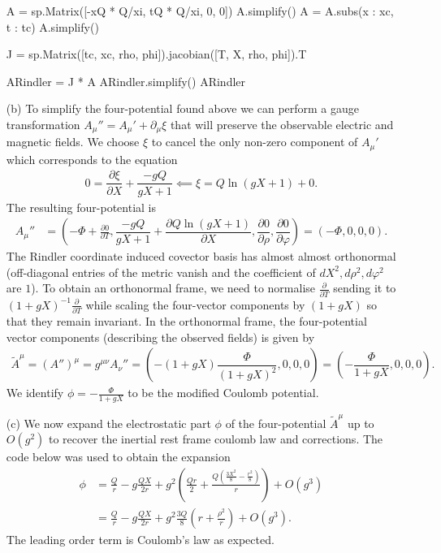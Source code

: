 \documentclass[10pt, a4paper]{article}
\begin{document}
\begin{enumerate}
\begin{python}
A = sp.Matrix([-xQ * Q/xi, tQ * Q/xi, 0, 0])
A.simplify()
A = A.subs({x : xc, t : tc})
A.simplify()

J = sp.Matrix([tc, xc, rho, phi]).jacobian([T, X, rho, phi]).T

ARindler = J * A
ARindler.simplify()
ARindler
  \end{python}
  \item[(b)] To simplify the four-potential found above we can perform a gauge transformation $A_\mu'' = A_\mu' + \partial_\mu \xi$ that will preserve the observable electric and magnetic fields. We choose $\xi$ to cancel the only non-zero component of $A_\mu'$ which corresponds to the equation 
  \begin{align*}
    0 = \dfrac{\partial \xi}{\partial X} + \dfrac{-gQ}{gX+1} \impliedby \xi = Q\ln(gX + 1) + 0. 
  \end{align*}
  The resulting four-potential is 
  \begin{align*}
    A_{\mu}'' &= \left(-\Phi + \frac{\partial 0}{\partial T}, \dfrac{-gQ}{gX+1} + \dfrac{\partial Q\ln(gX + 1)}{\partial X}, \dfrac{\partial 0}{\partial \rho}, \dfrac{\partial 0}{\partial \varphi}\right) = \left(-\Phi, 0, 0,0\right).
  \end{align*}
  The Rindler coordinate induced covector basis has almost almost orthonormal (off-diagonal entries of the metric vanish and the coefficient of $dX^2, d\rho^2, d\varphi^2$ are $1$). To obtain an orthonormal frame, we need to normalise $\frac{\partial}{\partial T}$ sending it to $(1+gX)^{-1}\frac{\partial}{\partial T}$ while scaling the four-vector components by $(1+gX)$ so that they remain invariant. In the orthonormal frame, the four-potential vector components (describing the observed fields) is given by 
  \begin{align*}
    \tilde{A}^{\mu}= (A'')^{\mu} = g^{\mu \nu} A_{\nu}'' = \left(-(1 + g X)\dfrac{\Phi}{(1 + g X)^2}, 0, 0, 0\right) = \left(-\dfrac{\Phi}{1 + g X}, 0, 0, 0\right).
  \end{align*}
  We identify $\phi = -\frac{\Phi}{1 + g X}$ to be the modified Coulomb potential. 
  \item[(c)] We now expand the electrostatic part $\phi$ of the four-potential $\tilde{A}^{\mu}$ up to $O(g^2)$ to recover the inertial rest frame coulomb law and corrections. The code below was used to obtain the expansion
  \begin{align*}
    \phi &= \frac{Q}{r} - g\frac{Q X}{2 r} + g^{2} \left(\frac{Q r}{2} + \frac{Q \left(\frac{3 X^{2}}{8} - \frac{r^{2}}{8}\right)}{r}\right)+ O\left(g^{3}\right)\\
    &= \frac{Q}{r} - g\frac{Q X}{2 r} + g^{2} \frac{3Q}{8}\left(r + \frac{ \rho^{2}}{r}\right)+ O\left(g^{3}\right).
  \end{align*}
  The leading order term is Coulomb's law as expected.


\end{enumerate}
\end{document}
